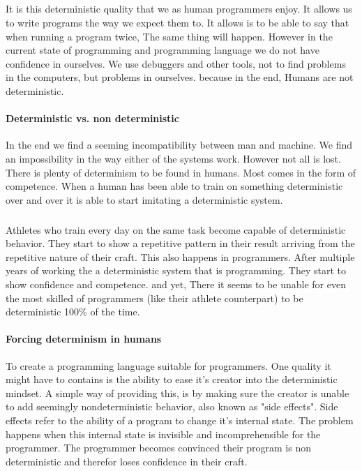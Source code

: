\documentclass{scrartcl}
\begin{document}
    \subparagraph{}
    It is this deterministic quality that we as human programmers enjoy. It allows
    us to write programs the way we expect them to. It allows is to be able to say that
    when running a program twice, The same thing will happen. However in the current state
    of programming and programming language we do not have confidence in ourselves. 
    We use debuggers and other tools, not to find problems in the computers, but problems in
    ourselves. because in the end, Humans are not deterministic.

    \paragraph{Deterministic vs. non deterministic}
    In the end we find a seeming incompatibility between man and machine.
    We find an impossibility in the way either of the systems work. However
    not all is lost. There is plenty of determinism to be found in humans.
    Most comes in the form of competence. When a human has been able to train
    on something deterministic over and over it is able to start imitating a
    deterministic system. 
    
    \subparagraph{}
    Athletes who train every day on the same task become
    capable of deterministic behavior. They start to show a repetitive pattern
    in their result arriving from the repetitive nature of their craft. This also
    happens in programmers. After multiple years of working the a deterministic 
    system that is programming. They start to show confidence and competence. and
    yet, There it seems to be unable for even the most skilled of programmers (like
    their athlete counterpart) to be deterministic 100\% of the time.

    \paragraph{Forcing determinism in humans}
    To create a programming language suitable for programmers. One quality it might
    have to contains is the ability to ease it's creator into the deterministic mindset.
    A simple way of providing this, is by making sure the creator is unable to add
    seemingly nondeterministic behavior, also known as "side effects". Side effects
    refer to the ability of a program to change it's internal state. The problem happens
    when this internal state is invisible and incomprehensible for the programmer.
    The programmer becomes convinced their program is non deterministic and therefor 
    loses confidence in their craft. 
    
\end{document}
